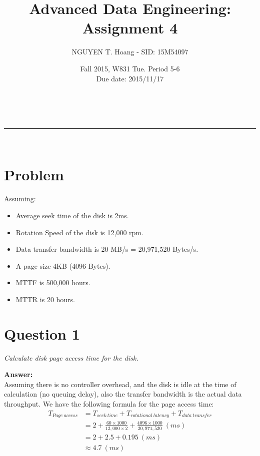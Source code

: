 \documentclass[a4paper,11pt]{article}
\makeatletter
\newcommand{\linia}{\rule{\linewidth}{0.5pt}}
\renewcommand{\maketitle}{
\begin{center}
\vspace{2ex}
{\huge \textsc{\@title}}
\vspace{1ex}
\\
\linia\\
\@author \hfill \@date
\vspace{4ex}
\end{center}
}
\makeatother
\begin{document}
\title{Advanced Data Engineering: Assignment 4}

\author{NGUYEN T. Hoang - SID: 15M54097}

\date{Fall 2015, W831 Tue. Period 5-6 \\ \hfill Due date: 2015/11/17}

\maketitle

\section*{Problem}

Assuming:
\begin{itemize}
    \setlength{\itemsep}{0cm}
    \setlength{\parskip}{0cm}
    \item Average seek time of the disk is 2ms.
    \item Rotation Speed of the disk is 12,000 rpm.
    \item Data transfer bandwidth is 20 MB/s = 20,971,520 Bytes/s.
    \item A page size 4KB (4096 Bytes).
    \item MTTF is 500,000 hours.
    \item MTTR is 20 hours.
\end{itemize}
\section*{Question 1}

\textit{Calculate disk page access time for the disk.} 

\noindent
\textbf{Answer:} \\ 
Assuming there is no controller overhead, and the disk is idle at the time of calculation (no queuing delay), also the transfer bandwidth is the actual data throughput. We have the following formula for the page access time:
\begin{equation*}
    \begin{aligned}
        T_{Page\ access} &= T_{seek\ time} + T_{rotational\ latency} + T_{data\ transfer} \\
        & = 2 + \frac{60 \times 1000}{12,000 \times 2} + \frac{4096 \times 1000}{20,971,520} \ (ms) \\
        & = 2 + 2.5 + 0.195 \ (ms) \\
        & \approx 4.7 \ (ms)
    \end{aligned}
\end{equation*}
\end{document}
